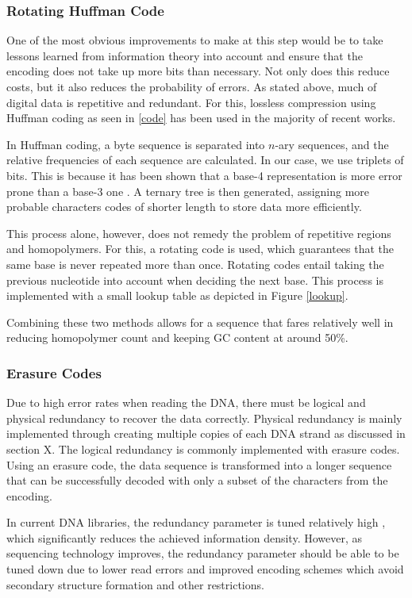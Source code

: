 \documentclass[a4paper,conference]{IEEEtran}
\begin{document}
\subsubsection{Rotating Huffman Code}
One of the most obvious improvements to make at this step would be to take lessons learned from information theory into account and ensure that the encoding does not take up more bits than necessary. Not only does this reduce costs, but it also reduces the probability of errors. As stated above, much of digital data is repetitive and redundant. For this, lossless compression using Huffman coding \cite{mackay_information_2003} as seen in \ref{code} has been used in the majority of recent works.

In Huffman coding, a byte sequence is separated into $n$-ary sequences, and the relative frequencies of each sequence are calculated. In our case, we use triplets of bits. This is because it has been shown that a base-4 representation is more error prone than a base-3 one \cite{goldman_towards_2013}. A ternary tree is then generated, assigning more probable characters codes of shorter length to store data more efficiently.

This process alone, however, does not remedy the problem of repetitive regions and homopolymers. For this, a rotating code is used, which guarantees that the same base is never repeated more than once. Rotating codes entail taking the previous nucleotide into account when deciding the next base. This process is implemented with a small lookup table as depicted in Figure \ref{lookup}.

Combining these two methods allows for a sequence that fares relatively well in reducing homopolymer count and keeping GC content at around 50\%.

\subsubsection{Erasure Codes}
Due to high error rates when reading the DNA, there must be logical and physical redundancy to recover the data correctly. Physical redundancy is mainly implemented through creating multiple copies of each DNA strand as discussed in section X. The logical redundancy is commonly implemented with erasure codes. Using an erasure code, the data sequence is transformed into a longer sequence that can be successfully decoded with only a subset of the characters from the encoding.

In current DNA libraries, the redundancy parameter is tuned relatively high \cite{organick_random_2018}, which significantly reduces the achieved information density. However, as sequencing technology improves, the redundancy parameter should be able to be tuned down \cite{organick_random_2018} due to lower read errors and improved encoding schemes which avoid secondary structure formation and other restrictions.
\end{document}
